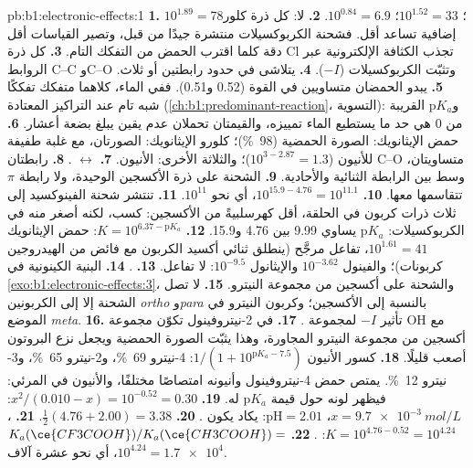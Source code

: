 \begin{solution}{pb:b1:electronic-effects:1}
\textbf{1.} $10^{1.89} = 78$؛ $10^{1.52} = 33$؛ $10^{0.84} = 6.9$.
\textbf{2.} لا: كل ذرة كلور إضافية تساعد أقل. فشحنة
الكربوكسيلات منتشرة جيدًا من قبل، وتصير القياسات أقل
دقة كلما اقترب الحمض من التفكك التام.
\textbf{3.} كل ذرة Cl تجذب الكثافة الإلكترونية عبر الروابط C--C وC--O
وتثبّت الكربوكسيلات ($-I$).
\textbf{4.} يتلاشى  في حدود رابطتين أو ثلاث.
\textbf{5.} يبدو الحمضان متساويين في القوة (0.52 و0.51). ففي الماء،
كلاهما متفكك تفككًا شبه تام عند التراكيز المعتادة
(\cref{ch:b1:predominant-reaction}، التسوية): و$\mathrm{p}K_a$ القريبة من 0
هي حد ما يستطيع الماء تمييزه، والقيمتان تحملان
عدم يقين يبلغ بضعة أعشار.
\textbf{6.} حمض الإيثانويك: الصورة الحمضية (\qty{98}{\percent})؛ كلورو الإيثانويك:
الصورتان، مع غلبة طفيفة للأنيون ($10^{3 - 2.87} = 1.3$)؛ والثلاثة
الأخرى: الأنيون.
\textbf{7.}  $\leftrightarrow$ .
\textbf{8.} رابطتان C--O متساويتان، وسط بين الرابطة الثنائية والأحادية.
\textbf{9.} الشحنة على ذرة الأكسجين الوحيدة، ولا رابطة $\pi$ تتقاسمها
معها.
\textbf{10.} $10^{15.9 - 4.76} = 10^{11.1}$، أي نحو $10^{11}$.
\textbf{11.} تنتشر شحنة الفينوكسيد إلى ثلاث ذرات كربون في الحلقة، أقل
كهرسلبيةً من الأكسجين: كسب، لكنه أصغر منه في الكربوكسيلات:
$\mathrm{p}K_a$ يساوي 9.99 بين 4.76 و15.9.
\textbf{12.} $K = 10^{6.37 - \mathrm{p}K_a}$: حمض الإيثانويك $10^{1.61} = 41$،
تفاعل مرجَّح (ينطلق ثنائي أكسيد الكربون مع فائض من الهيدروجين كربونات)؛
والفينول $10^{-3.62}$ والإيثانول $10^{-9.5}$: لا تفاعل.
\textbf{13.} .
\textbf{14.} البنية الكينونية في \cref{exo:b1:electronic-effects:3}،
والشحنة على أكسجين من مجموعة النيترو.
\textbf{15.} لا تصل الشحنة إلا إلى الكربونين \textit{ortho}
و\textit{para} بالنسبة إلى الأكسجين؛ وكربون النيترو في الموضع \textit{meta}.
\textbf{16.} تأثير $-I$ لمجموعة .
\textbf{17.} في 2-نيتروفينول تكوّن مجموعة OH  مع أكسجين
من مجموعة النيترو المجاورة، وهذا يثبّت الصورة الحمضية ويجعل
نزع البروتون أصعب قليلًا.
\textbf{18.} كسور الأنيون $1/(1 + 10^{\mathrm{p}K_a - 7.5})$: 4-نيترو
\qty{69}{\percent}، و2-نيترو \qty{65}{\percent}، و3-نيترو
\qty{12}{\percent}. يمتص حمض 4-نيتروفينول وأنيونه امتصاصًا مختلفًا،
والأنيون في المرئي: فيظهر لونه حول قيمة $\mathrm{p}K_a$ له.
\textbf{19.} $x^2/(0.010 - x) = 10^{-0.52} = 0.30$: $x = \qty{9.7e-3}{mol/L}$،
$\mathrm{pH} = 2.01$: يكاد يكون .
\textbf{20.} $\frac12(4.76 + 2.00) = 3.38$.
\textbf{21.} ، $K = 10^{4.76 -
0.52} = 10^{4.24}$: .
\textbf{22.} $K_a(\ce{CF3COOH})/K_a(\ce{CH3COOH}) =$ \textbf{$10^{4.24} =
\num{1.7e4}$}، أي نحو عشرة آلاف.
\end{solution}
